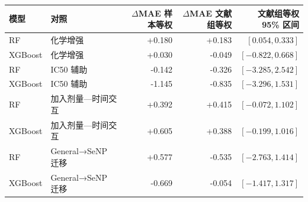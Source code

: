 \begin{tabularx}{\linewidth}{lXrrr}
\toprule
模型 & 对照 & \shortstack{$\Delta$MAE\\样本等权} & \shortstack{$\Delta$MAE\\文献组等权} & \shortstack{文献组等权\\95\% 区间} \\
\midrule
RF & 化学增强 & +0.180 & +0.183 & $[0.054, 0.333]$ \\
XGBoost & 化学增强 & +0.030 & -0.049 & $[-0.822, 0.668]$ \\
RF & IC50 辅助 & -0.142 & -0.326 & $[-3.285, 2.542]$ \\
XGBoost & IC50 辅助 & -1.145 & -0.835 & $[-3.296, 1.531]$ \\
RF & 加入剂量—时间交互 & +0.392 & +0.415 & $[-0.072, 1.102]$ \\
XGBoost & 加入剂量—时间交互 & +0.605 & +0.388 & $[-0.199, 1.016]$ \\
RF & General→SeNP 迁移 & +0.577 & -0.535 & $[-2.763, 1.414]$ \\
XGBoost & General→SeNP 迁移 & -0.669 & -0.054 & $[-1.417, 1.317]$ \\
\bottomrule
\end{tabularx}
